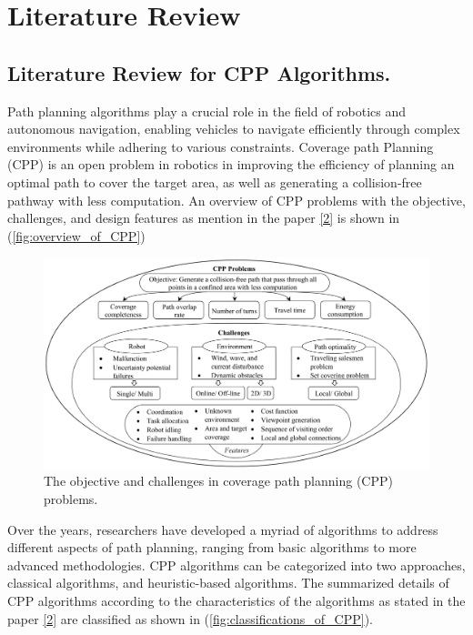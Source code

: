 \chapter{Literature Review}
\section{Literature Review for CPP Algorithms.}


Path planning algorithms play a crucial role in the field of robotics and autonomous navigation, enabling vehicles to navigate efficiently through complex environments while adhering to various constraints. Coverage path Planning (CPP) is an open problem in robotics in improving the efficiency of planning an optimal path to cover the target area, as well as generating a collision-free pathway with less computation. An overview of CPP problems with the objective, challenges, and design features as mention in the paper \hyperlink{cite.main_review}{[2]} is shown in (\autoref{fig:overview_of_CPP})


\begin{figure}[htbp]
    \centering
    \includegraphics[width=\textwidth]{Images/general/overview_of_CPP.png}
    \caption{The objective and challenges in coverage path planning (CPP) problems.}
    \label{fig:overview_of_CPP}
\end{figure}

Over the years, researchers have developed a myriad of algorithms to address different aspects of path planning, ranging from basic algorithms to more advanced methodologies. CPP algorithms can be categorized into two approaches, classical algorithms, and heuristic-based algorithms. The summarized details of CPP algorithms according to the characteristics of the algorithms as stated in the paper \hyperlink{cite.main_review}{[2]} are classified as shown in (\autoref{fig:classifications_of_CPP}). 


